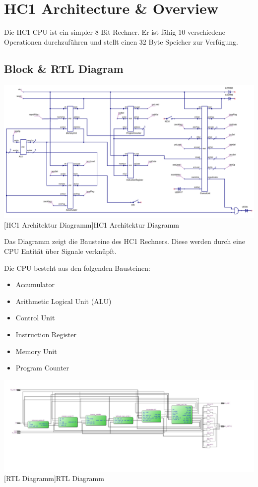 \section{HC1 Architecture \& Overview}

Die HC1 CPU ist ein simpler 8 Bit Rechner. Er ist fähig 10 verschiedene Operationen durchzuführen und stellt einen 32 Byte Speicher zur Verfügung.

\subsection{Block \& RTL Diagram}

\vspace{1em}
\begin{minipage}{\linewidth}
    \centering
    \includegraphics[width=1.0\linewidth]{images/cpu_block.png}
    [HC1 Architektur Diagramm]{HC1 Architektur Diagramm}
    \label{fig:block_diagram}
\end{minipage}

Das Diagramm zeigt die Bausteine des HC1 Rechners. Diese werden durch eine CPU Entität über Signale verknüpft.

Die CPU besteht aus den folgenden Bausteinen:

\begin{itemize}
	\item Accumulator
	\item Arithmetic Logical Unit (ALU)
	\item Control Unit
	\item Instruction Register
	\item Memory Unit
	\item Program Counter
\end{itemize}

\vspace{1em}
\begin{minipage}{\linewidth}
    \centering
    \includegraphics[width=1.0\linewidth]{images/rtl.jpg}
    [RTL Diagramm]{RTL Diagramm}
    \label{fig:rtl_diagram}
\end{minipage}


